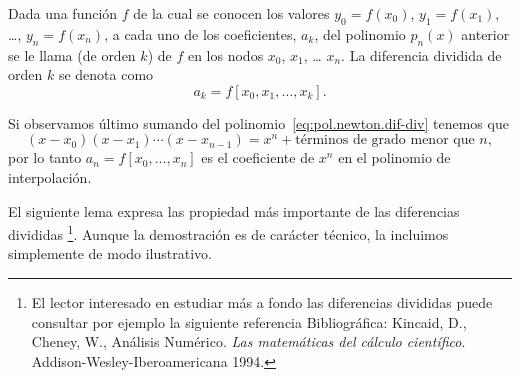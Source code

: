 \begin{definition}
  Dada una función $f$ de la cual se conocen los valores $y_0=f(x_0)$,
  $y_1=f(x_1)$, \dots, $y_n=f(x_n)$, 
  a cada uno de los coeficientes, $a_k$, del polinomio $p_n(x)$
  anterior se le llama  (de orden $k$) de $f$ en los nodos $x_0$, $x_1$, \dots
  $x_n$. La diferencia dividida de orden $k$ se denota como
  $$
  a_k = f[x_0,x_1,\dots,x_k].
  $$
\end{definition}

\begin{remark}
  Si observamos último sumando del
  polinomio~\eqref{eq:pol.newton.dif-div} tenemos que
   $$
   (x-x_0)(x-x_1)\cdots (x-x_{n-1}) = x^n + \text{términos de grado
     menor que $n$},
   $$
   por lo tanto $a_n=f[x_0,...,x_n]$ es el coeficiente de $x^n$ en el
   polinomio de interpolación.
\label{rk:2}

 \end{remark}
El siguiente lema expresa las propiedad más importante de las
diferencias divididas%
\footnote{El lector interesado en estudiar más a fondo las
  diferencias divididas  puede consultar por ejemplo la
  siguiente referencia Bibliográfica: Kincaid, D., Cheney, W.,
  Análisis Numérico. \textit{Las matemáticas del cálculo
    científico}. Addison-Wesley-Iberoamericana 1994.}. Aunque la
demostración es de carácter técnico, la incluimos simplemente de
modo ilustrativo.


